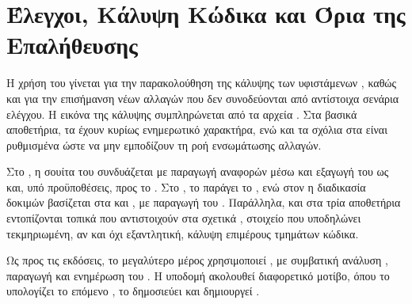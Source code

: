 \section{Έλεγχοι, Κάλυψη Κώδικα και Όρια της Επαλήθευσης}
\label{sec:appendix_testing_coverage}


Η χρήση του  γίνεται για την παρακολούθηση της κάλυψης των υφιστάμενων , καθώς και για την επισήμανση νέων αλλαγών
που δεν συνοδεύονται από αντίστοιχα σενάρια ελέγχου. Η εικόνα της κάλυψης συμπληρώνεται από τα αρχεία \texttt{}. Στα βασικά αποθετήρια,
τα  έχουν κυρίως ενημερωτικό χαρακτήρα,
ενώ και τα σχόλια στα  είναι ρυθμισμένα ώστε να μην εμποδίζουν τη ροή ενσωμάτωσης αλλαγών.

Στο \texttt{}, η σουίτα του  συνδυάζεται με παραγωγή αναφορών μέσω 
και εξαγωγή του \texttt{} ως  και, υπό προϋποθέσεις, προς το .
Στο \texttt{}, το  παράγει το \texttt{}, ενώ στον \texttt{}
η διαδικασία δοκιμών βασίζεται στα \texttt{} και , με παραγωγή του \texttt{}.
Παράλληλα, και στα τρία αποθετήρια εντοπίζονται τοπικά  που αντιστοιχούν στα σχετικά ,
στοιχείο που υποδηλώνει τεκμηριωμένη, αν και όχι εξαντλητική, κάλυψη επιμέρους τμημάτων κώδικα.

Ως προς τις εκδόσεις, το μεγαλύτερο μέρος χρησιμοποιεί , με συμβατική ανάλυση ,
παραγωγή  και ενημέρωση του . Η υποδομή ακολουθεί διαφορετικό μοτίβο, όπου το 
υπολογίζει το επόμενο , το δημοσιεύει και δημιουργεί .

\begin{table}[H]
\centering
\caption{Τρέχουσα εικόνα δοκιμών, κάλυψης κώδικα και  στα βασικά αποθετήρια}
\label{tab:appendix_test_coverage_matrix}

\end{table}
